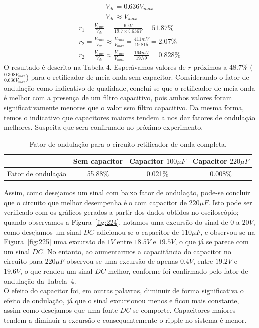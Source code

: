 \documentclass[12pt,a4paper]{article}
\begin{document}
 \begin{align}
   \label{eq:ondacompleta}
   V_{dc}  =0.636 V_{max}  \\
   \label{eq:ondacompletacapacitor}
   V_{dc} \approx V_{max}
 \end{align}
\begin{align}
  r_1 = \frac{V_{rms}}{V_{dc}}= \frac{6.5 V}{19.7 \times 0.636 V}= 51.87\%\\
  r_2= \frac{V_{rms}}{V_{dc}} \approx \frac{V_{rms}}{V_{max}} = \frac{411 mV}{19.815}= 2.07 \% \\
  r_2= \frac{V_{rms}}{V_{dc}} \approx \frac{V_{rms}}{V_{max}} = \frac{164 mV}{19.79}= 0.828 \%
\end{align}
O resultado é descrito na Tabela 4. Esperávamos valores de $r$ próximos a $48.7\%$ ($\frac{0.308 V_{max}}{0.636 V_{max}}$) para o retificador de meia onda sem capacitor. Considerando o fator de ondulação como indicativo de qualidade, conclui-se que o retificador de meia onda é melhor com a presença de um filtro capacitivo, pois ambos valores foram significativamente menores que o valor sem filtro capacitivo. Da mesma forma, temos o indicativo que capacitores maiores tendem a nos dar fatores de ondulação melhores. Suspeita que sera confirmado no próximo experimento. 
    \begin{table}[htpb]
        \centering
        \caption{Fator de ondulação para o circuito retificador de onda completa.}
        \begin{tabular}{l c c c}
        \toprule
        & Sem capacitor & Capacitor $100 \mu F$ & Capacitor $220 \mu F$ \\ \midrule
        \multicolumn{1}{c}{Fator de ondulação} & 55.88\%       &  0.021\%  &  0.008\%                \\ \bottomrule
        \end{tabular}
        \end{table}

        Assim, como desejamos um sinal com baixo fator de ondulação, pode-se concluir que o circuito que melhor desempenha é o com capacitor de $220 \mu F$. Isto pode ser verificado com os gráficos gerados a partir dos dados obtidos no osciloscópio; quando observamos a Figura~\ref{fig:224}, notamos uma excursão do sinal de $0$ a $20V$, como desejamos um sinal $DC$ adicionou-se o capacitor de $110 \mu F$, e observou-se na Figura~\ref{fig:225} uma excursão de $1V$ entre $18.5 V$ e $19.5 V$, o que já se parece com um sinal $DC$. No entanto, ao aumentarmos a capacitância do capacitor no circuito para $220 \mu F$ observou-se uma excursão de apenas $0.4 V$, entre $19.2 V$ e $19.6V$, o que rendeu um sinal $DC$ melhor, conforme foi confirmado pelo fator de ondulação da Tabela~4. \\
        O efeito do capacitor foi, em outras palavras, diminuir de forma significativa o efeito de ondulação, já que o sinal excursionou menos e ficou mais constante, assim como desejamos que uma fonte $DC$ se comporte. Capacitores maiores tendem a diminuir a excursão e consequentemente o ripple no sistema é menor.
\end{document}
